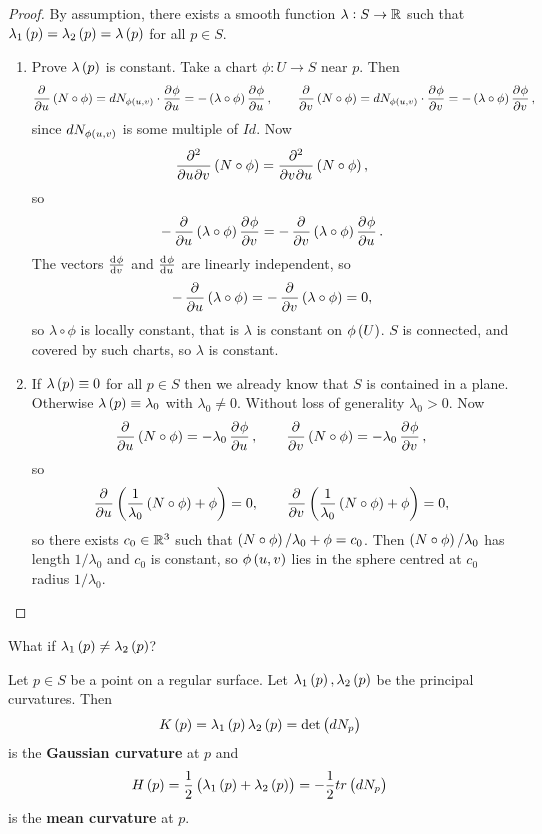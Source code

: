 \begin{proof}
By assumption, there exists a smooth function $ \lambda : S \to \mathbb{R} $ such that $ \lambda_1\br{p} = \lambda_2\br{p} = \lambda\br{p} $ for all $ p \in S $.
\begin{enumerate}[leftmargin=0.5in, label=Step \arabic*.]
\item Prove $ \lambda\br{p} $ is constant. Take a chart $ \phi : U \to S $ near $ p $. Then
$$ \dpd{}{u}\br{N \circ \phi} = dN_{\phi\br{u, v}} \cdot \dpd{\phi}{u} = -\br{\lambda \circ \phi}\dpd{\phi}{u}, \qquad \dpd{}{v}\br{N \circ \phi} = dN_{\phi\br{u, v}} \cdot \dpd{\phi}{v} = -\br{\lambda \circ \phi}\dpd{\phi}{v}, $$
since $ dN_{\phi\br{u, v}} $ is some multiple of $ Id $.
Now
$$ \dmd{}{2}{u}{}{v}{}\br{N \circ \phi} = \dmd{}{2}{v}{}{u}{}\br{N \circ \phi}, $$
so
$$ -\dpd{}{u}\br{\lambda \circ \phi}\dpd{\phi}{v} = -\dpd{}{v}\br{\lambda \circ \phi}\dpd{\phi}{u}. $$
The vectors $ \tod{\phi}{v} $ and $ \tod{\phi}{u} $ are linearly independent, so
$$ -\dpd{}{u}\br{\lambda \circ \phi} = -\dpd{}{v}\br{\lambda \circ \phi} = 0, $$
so $ \lambda \circ \phi $ is locally constant, that is $ \lambda $ is constant on $ \phi\br{U} $. $ S $ is connected, and covered by such charts, so $ \lambda $ is constant.
\item If $ \lambda\br{p} \equiv 0 $ for all $ p \in S $ then we already know that $ S $ is contained in a plane. Otherwise $ \lambda\br{p} \equiv \lambda_0 $ with $ \lambda_0 \ne 0 $. Without loss of generality $ \lambda_0 > 0 $. Now
$$ \dpd{}{u}\br{N \circ \phi} = -\lambda_0\dpd{\phi}{u}, \qquad \dpd{}{v}\br{N \circ \phi} = -\lambda_0\dpd{\phi}{v}, $$
so
$$ \dpd{}{u}\br{\dfrac{1}{\lambda_0}\br{N \circ \phi} + \phi} = 0, \qquad \dpd{}{v}\br{\dfrac{1}{\lambda_0}\br{N \circ \phi} + \phi} = 0, $$
so there exists $ c_0 \in \mathbb{R}^3 $ such that $ \br{N \circ \phi} / \lambda_0 + \phi = c_0 $. Then $ \br{N \circ \phi} / \lambda_0 $ has length $ 1 / \lambda_0 $ and $ c_0 $ is constant, so $ \phi\br{u, v} $ lies in the sphere centred at $ c_0 $ radius $ 1 / \lambda_0 $.
\end{enumerate}
\end{proof}


What if $ \lambda_1\br{p} \ne \lambda_2\br{p} $?

\begin{definition}
Let $ p \in S $ be a point on a regular surface. Let $ \lambda_1\br{p}, \lambda_2\br{p} $ be the principal curvatures. Then
$$ K\br{p} = \lambda_1\br{p}\lambda_2\br{p} = \det\br{dN_p} $$
is the \textbf{Gaussian curvature} at $ p $ and
$$ H\br{p} = \dfrac{1}{2}\br{\lambda_1\br{p} + \lambda_2\br{p}} = -\dfrac{1}{2}tr\br{dN_p} $$
is the \textbf{mean curvature} at $ p $.
\end{definition}

